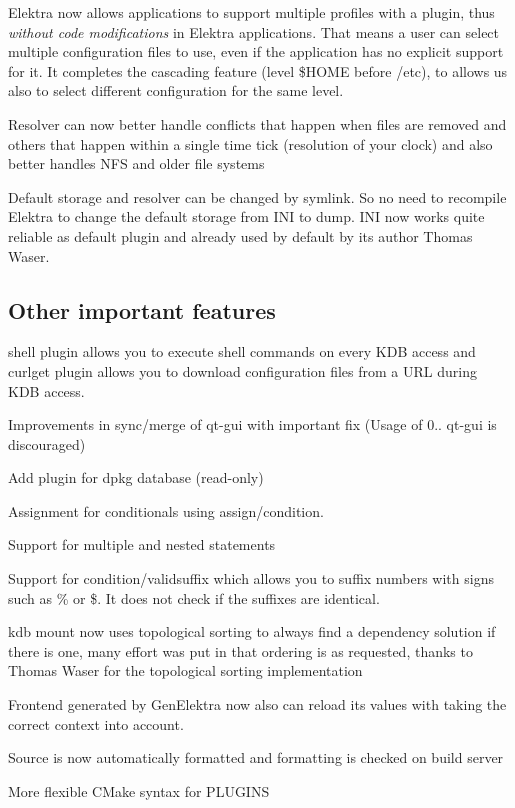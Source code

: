 \begin{DoxyItemize}
\item Elektra now allows applications to support multiple profiles with a plugin, thus {\itshape without code modifications} in Elektra applications. That means a user can select multiple configuration files to use, even if the application has no explicit support for it. It completes the cascading feature (level \$\+H\+O\+M\+E before /etc), to allows us also to select different configuration for the same level.
\item Resolver can now better handle conflicts that happen when files are removed and others that happen within a single time tick (resolution of your clock) and also better handles N\+F\+S and older file systems
\item Default storage and resolver can be changed by symlink. So no need to recompile Elektra to change the default storage from I\+N\+I to dump. I\+N\+I now works quite reliable as default plugin and already used by default by its author Thomas Waser.
\end{DoxyItemize}

\subsection*{Other important features}


\begin{DoxyItemize}
\item shell plugin allows you to execute shell commands on every K\+D\+B access and curlget plugin allows you to download configuration files from a U\+R\+L during K\+D\+B access.
\item Improvements in sync/merge of qt-\/gui with important fix (Usage of 0.. qt-\/gui is discouraged)
\item Add plugin for dpkg database (read-\/only)
\item Assignment for conditionals using {\ttfamily assign/condition}.
\item Support for multiple and nested statements
\item Support for {\ttfamily condition/validsuffix} which allows you to suffix numbers with signs such as {\ttfamily \%} or {\ttfamily \$}. It does not check if the suffixes are identical.
\item kdb mount now uses topological sorting to always find a dependency solution if there is one, many effort was put in that ordering is as requested, thanks to Thomas Waser for the topological sorting implementation
\item Frontend generated by Gen\+Elektra now also can reload its values with taking the correct context into account.
\item Source is now automatically formatted and formatting is checked on build server
\item More flexible C\+Make syntax for P\+L\+U\+G\+I\+N\+S
\end{DoxyItemize}

